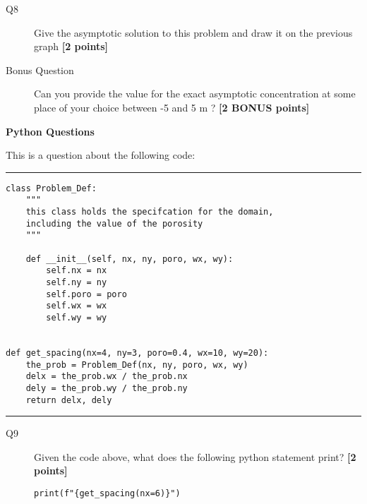 \documentclass{article}
\begin{document}

\begin{description}
\item [Q8] Give the asymptotic solution to this problem and draw it on the previous graph  \textbf{[2 points]}

\item[Bonus Question] Can you provide the value for the exact asymptotic concentration at some place of your choice between -5 and 5 m ? \textbf{[2 BONUS points]}
\vspace{2cm}

\end{description}


\newpage
\textbf{Python Questions}


This is a question about the following code:

\rule{15cm}{0.75pt}


\begin{verbatim}
class Problem_Def:
    """
    this class holds the specifcation for the domain,
    including the value of the porosity
    """

    def __init__(self, nx, ny, poro, wx, wy):
        self.nx = nx
        self.ny = ny
        self.poro = poro
        self.wx = wx
        self.wy = wy


def get_spacing(nx=4, ny=3, poro=0.4, wx=10, wy=20):
    the_prob = Problem_Def(nx, ny, poro, wx, wy)
    delx = the_prob.wx / the_prob.nx
    dely = the_prob.wy / the_prob.ny
    return delx, dely
\end{verbatim}

\rule{15cm}{0.75pt}

\begin{description}

\item[Q9] Given the code above, what does the following python statement print?
  \textbf{[2 points]}
  
\verb+print(f"{get_spacing(nx=6)}")+

\vspace{1.5cm}
  
\end{description}
\end{document}
